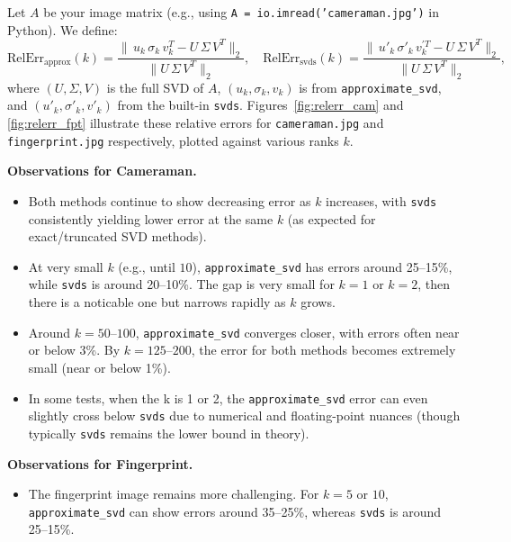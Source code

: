 \documentclass[11pt,a4paper, margin=1in]{article}
\begin{document}
\begin{enumerate}
    Let $A$ be your image matrix (e.g., using 
    \texttt{A = io.imread('cameraman.jpg')} in Python).
    We define:
    \[
       \text{RelErr}_{\text{approx}}(k) = 
       \frac{\|\,u_{k}\,\sigma_{k}\,v_{k}^{T} - U\,\Sigma\,V^T\|_{2}}
            {\|U\,\Sigma\,V^T\|_{2}}, 
       \quad
       \text{RelErr}_{\text{svds}}(k) = 
       \frac{\|\,u'_{k}\,\sigma'_{k}\,v_{k}^{'T} - U\,\Sigma\,V^T\|_{2}}
            {\|U\,\Sigma\,V^T\|_{2}},
    \]
    where $(U,\Sigma,V)$ is the full SVD of $A$, 
    $(u_k, \sigma_k, v_k)$ is from \texttt{approximate\_svd}, 
    and $(u'_k, \sigma'_k, v'_k)$ from the built-in \texttt{svds}.
    Figures~\ref{fig:relerr_cam} and \ref{fig:relerr_fpt} illustrate these relative errors 
    for \texttt{cameraman.jpg} and \texttt{fingerprint.jpg} respectively, 
    plotted against various ranks $k$. 

    \textbf{Observations for Cameraman.} 
    \begin{itemize}
      \item Both methods continue to show decreasing error as $k$ increases, 
      with \texttt{svds} consistently yielding lower error at the same $k$ 
      (as expected for exact/truncated SVD methods).
      
      \item At very small $k$ (e.g., until $10$), \texttt{approximate\_svd} 
      has errors around 25--15\%, while \texttt{svds} is around 20--10\%. 
      The gap is very small for \(k=1 \text{ or } k=2\), then there is a noticable one but narrows rapidly as $k$ grows.
      
      \item Around $k=50$--$100$, \texttt{approximate\_svd} converges closer, 
      with errors often near or below 3\%. By $k=125$--$200$, 
      the error for both methods becomes extremely small (near or below 1\%).
      
      \item In some tests, when the k is 1 or 2, the \texttt{approximate\_svd} 
      error can even slightly cross below \texttt{svds} due to numerical 
      and floating-point nuances (though typically \texttt{svds} remains 
      the lower bound in theory).
    \end{itemize}

    \textbf{Observations for Fingerprint.} 
    \begin{itemize}
      \item The fingerprint image remains more challenging. 
      For $k=5$ or $10$, \texttt{approximate\_svd} can show errors 
      around 35--25\%, whereas \texttt{svds} is around 25--15\%.
      

\end{itemize}
\end{enumerate}
\end{document}
